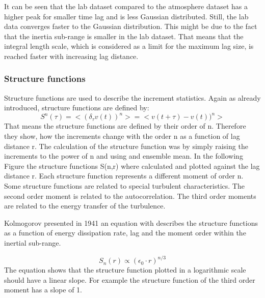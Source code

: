 \documentclass[12pt]{article}
\begin{document}
It can be seen that the lab dataset compared to the atmosphere dataset has a higher peak for smaller time lag and is less Gaussian distributed. Still, the lab data converges faster to the Gaussian distribution. This might be due to the fact that the inertia sub-range is smaller in the lab dataset. That means that the integral length scale, which is considered as a limit for the maximum lag size, is reached faster with increasing lag distance.
\subsubsection{Structure functions}
Structure functions are used to describe the increment statistics. Again as already introduced, structure functions are defined by:
\begin{equation}
S^n(\tau) = <(\delta_{\tau}v(t))^n> = <v(t+\tau)-v(t))^n>
\end{equation}
That means the structure functions are defined by their order of n. Therefore they show, how the increments change with the order n as a function of lag distance r. The calculation of the structure function was by simply raising the increments to the power of n and using and ensemble mean. In the following Figure the structure functions S(n,r) where calculated and plotted against the lag distance r. Each structure function represents a different moment of order n. Some structure functions are related to special turbulent characteristics. The second order moment is related to the autocorrelation. The third order moments are related to the energy transfer of the turbulence. 

Kolmogorov presented in 1941 an equation with describes the structure functions as a function of energy dissipation rate, lag and the moment order within the inertial sub-range. 

\begin{equation}
S_n(r) \propto (\epsilon_0 \cdot r)^{n/3}
\end{equation}
The equation shows that the structure function plotted in a logarithmic scale should have a linear slope. For example the structure function of the third order moment has a slope of 1.
\end{document}
